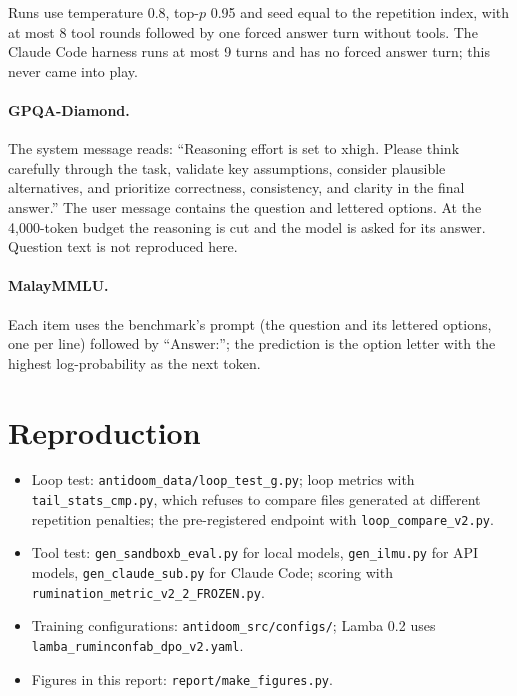 \documentclass[11pt]{article}
\begin{document}
Runs use temperature 0.8, top-$p$ 0.95 and seed equal to the repetition index, with at most 8 tool rounds followed by one forced answer turn without tools. The Claude Code harness runs at most 9 turns and has no forced answer turn; this never came into play.

\paragraph{GPQA-Diamond.} The system message reads: ``Reasoning effort is set to xhigh. Please think carefully through the task, validate key assumptions, consider plausible alternatives, and prioritize correctness, consistency, and clarity in the final answer.'' The user message contains the question and lettered options. At the 4,000-token budget the reasoning is cut and the model is asked for its answer. Question text is not reproduced here.

\paragraph{MalayMMLU.} Each item uses the benchmark's prompt (the question and its lettered options, one per line) followed by ``Answer:''; the prediction is the option letter with the highest log-probability as the next token.

\section{Reproduction}

\begin{itemize}[before=\raggedright]
  \item Loop test: \texttt{antidoom\_data/loop\_test\_g.py}; loop metrics with \texttt{tail\_stats\_cmp.py}, which refuses to compare files generated at different repetition penalties; the pre-registered endpoint with \texttt{loop\_compare\_v2.py}.
  \item Tool test: \texttt{gen\_sandboxb\_eval.py} for local models, \texttt{gen\_ilmu.py} for API models, \texttt{gen\_claude\_sub.py} for Claude Code; scoring with \texttt{rumination\_metric\_v2\_2\_FROZEN.py}.
  \item Training configurations: \texttt{antidoom\_src/configs/}; Lamba 0.2 uses \texttt{lamba\_ruminconfab\_dpo\_v2.yaml}.
  \item Figures in this report: \texttt{report/make\_figures.py}.
\end{itemize}
\end{document}
